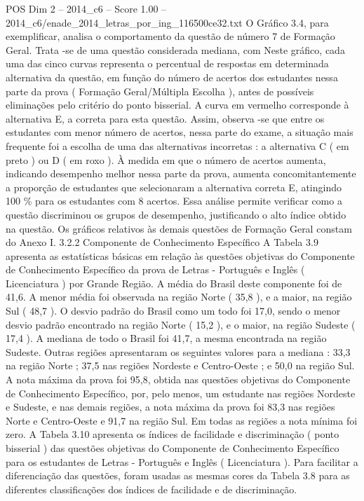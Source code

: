 \begin{textsample}{POS Dim 2 – 2014\_c6 – Score 1.00 – 2014\_c6/enade\_2014\_letras\_por\_ing\_116500ce32.txt}
O Gráfico 3.4, para exemplificar, analisa o comportamento da questão de número 7 de Formação Geral.
Trata -se de uma questão considerada mediana, com Neste gráfico, cada uma das cinco curvas representa o percentual de respostas em determinada alternativa da questão, em função do número de acertos dos estudantes nessa parte da prova ( Formação Geral/Múltipla Escolha ), antes de possíveis eliminações pelo critério do ponto bisserial.
A curva em vermelho corresponde à alternativa E, a correta para esta questão.
Assim, observa -se que entre os estudantes com menor número de acertos, nessa parte do exame, a situação mais frequente foi a escolha de uma das alternativas incorretas : a alternativa C ( em preto ) ou D ( em roxo ).
À medida em que o número de acertos aumenta, indicando desempenho melhor nessa parte da prova, aumenta concomitantemente a proporção de estudantes que selecionaram a alternativa correta E, atingindo 100 \% para os estudantes com 8 acertos.
Essa análise permite verificar como a questão discriminou os grupos de desempenho, justificando o alto índice obtido na questão.
Os gráficos relativos às demais questões de Formação Geral constam do Anexo I. 3.2.2 Componente de Conhecimento Específico A Tabela 3.9 apresenta as estatísticas básicas em relação às questões objetivas do Componente de Conhecimento Específico da prova de Letras - Português e Inglês ( Licenciatura ) por Grande Região.
A média do Brasil deste componente foi de 41,6.
A menor média foi observada na região Norte ( 35,8 ), e a maior, na região Sul ( 48,7 ).
O desvio padrão do Brasil como um todo foi 17,0, sendo o menor desvio padrão encontrado na região Norte ( 15,2 ), e o maior, na região Sudeste ( 17,4 ).
A mediana de todo o Brasil foi 41,7, a mesma encontrada na região Sudeste.
Outras regiões apresentaram os seguintes valores para a mediana : 33,3 na região Norte ; 37,5 nas regiões Nordeste e Centro-Oeste ; e 50,0 na região Sul.
A nota máxima da prova foi 95,8, obtida nas questões objetivas do Componente de Conhecimento Específico, por, pelo menos, um estudante nas regiões Nordeste e Sudeste, e nas demais regiões, a nota máxima da prova foi 83,3 nas regiões Norte e Centro-Oeste e 91,7 na região Sul.
Em todas as regiões a nota mínima foi zero.
A Tabela 3.10 apresenta os índices de facilidade e discriminação ( ponto bisserial ) das questões objetivas do Componente de Conhecimento Específico para os estudantes de Letras - Português e Inglês ( Licenciatura ).
Para facilitar a diferenciação das questões, foram usadas as mesmas cores da Tabela 3.8 para as diferentes classificações dos índices de facilidade e de discriminação.

\end{textsample}
